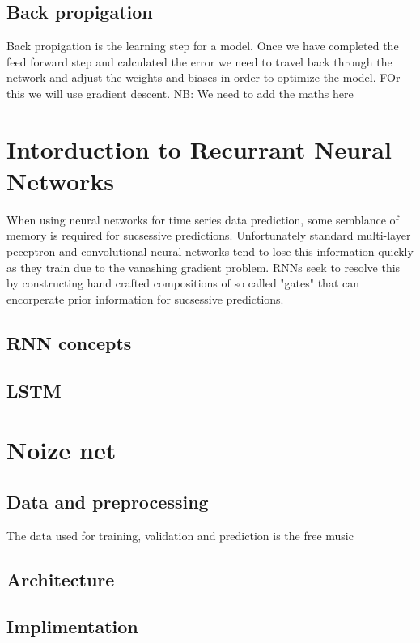 \documentclass{article}
\begin{document}
\subsection{Back propigation}
\label{sec:back}
Back propigation is the learning step for a model. Once we have completed the feed forward step and calculated the error we need to travel back through the network and adjust the weights and biases in order to optimize the model. FOr this we will use gradient descent.
NB: We need to add the maths here 

\section{Intorduction to Recurrant Neural Networks}
\label{sec:intoRNNs}
When using neural networks for time series data prediction, some semblance of memory is required for sucsessive predictions. Unfortunately standard multi-layer peceptron and convolutional neural networks tend to lose this information quickly as they train due to the vanashing gradient problem. RNNs seek to resolve this by constructing hand crafted compositions of so called "gates" that can encorperate prior information for sucsessive predictions. 

\subsection{RNN concepts}
\label{sec:RNNS}

\subsection{LSTM}
\label{sec:LSTM}

\section{Noize net}
\label{sec:nn}
\subsection{Data and preprocessing}
The data used for training, validation and prediction is the free music \cite{fma dataset}

\label{sec:data}

\subsection{Architecture}
\label{sec:arch}
\subsection{Implimentation}
\label{sec:impl}
\end{document}
